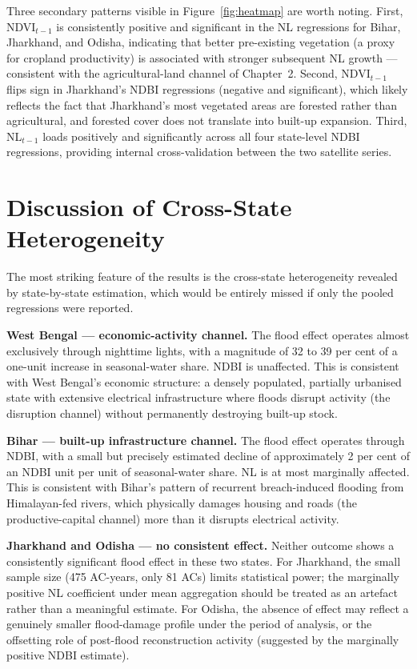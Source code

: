 \documentclass[12pt,a4paper,oneside]{report}
\begin{document}
Three secondary patterns visible in Figure~\ref{fig:heatmap} are worth noting. First, NDVI$_{t-1}$ is consistently positive and significant in the NL regressions for Bihar, Jharkhand, and Odisha, indicating that better pre-existing vegetation (a proxy for cropland productivity) is associated with stronger subsequent NL growth --- consistent with the agricultural-land channel of Chapter~2. Second, NDVI$_{t-1}$ flips sign in Jharkhand's NDBI regressions (negative and significant), which likely reflects the fact that Jharkhand's most vegetated areas are forested rather than agricultural, and forested cover does not translate into built-up expansion. Third, NL$_{t-1}$ loads positively and significantly across all four state-level NDBI regressions, providing internal cross-validation between the two satellite series.

\section{Discussion of Cross-State Heterogeneity}
The most striking feature of the results is the cross-state heterogeneity revealed by state-by-state estimation, which would be entirely missed if only the pooled regressions were reported.

\textbf{West Bengal --- economic-activity channel.} The flood effect operates almost exclusively through nighttime lights, with a magnitude of 32 to 39 per cent of a one-unit increase in seasonal-water share. NDBI is unaffected. This is consistent with West Bengal's economic structure: a densely populated, partially urbanised state with extensive electrical infrastructure where floods disrupt activity (the disruption channel) without permanently destroying built-up stock.

\textbf{Bihar --- built-up infrastructure channel.} The flood effect operates through NDBI, with a small but precisely estimated decline of approximately 2 per cent of an NDBI unit per unit of seasonal-water share. NL is at most marginally affected. This is consistent with Bihar's pattern of recurrent breach-induced flooding from Himalayan-fed rivers, which physically damages housing and roads (the productive-capital channel) more than it disrupts electrical activity.

\textbf{Jharkhand and Odisha --- no consistent effect.} Neither outcome shows a consistently significant flood effect in these two states. For Jharkhand, the small sample size (475 AC-years, only 81 ACs) limits statistical power; the marginally positive NL coefficient under mean aggregation should be treated as an artefact rather than a meaningful estimate. For Odisha, the absence of effect may reflect a genuinely smaller flood-damage profile under the period of analysis, or the offsetting role of post-flood reconstruction activity (suggested by the marginally positive NDBI estimate).
\end{document}
